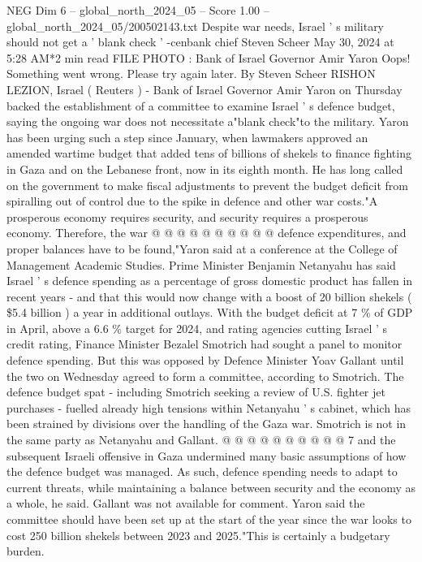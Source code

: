 \begin{textsample}{NEG Dim 6 – global\_north\_2024\_05 – Score 1.00 – global\_north\_2024\_05/200502143.txt}  \label{ex:f6_neg_303}
Despite war needs, Israel ' s military should not get a ' blank check ' -cenbank chief Steven Scheer May 30, 2024 at 5:28 AM*2 min read FILE PHOTO : Bank of Israel Governor Amir Yaron Oops!
Something went wrong.
Please try again later.
By Steven Scheer RISHON LEZION, Israel ( Reuters ) - Bank of Israel Governor Amir Yaron on Thursday backed the establishment of a committee to examine Israel ' s defence budget, saying the ongoing war does not necessitate a"blank check"to the military.
Yaron has been urging such a step since January, when lawmakers approved an amended wartime budget that added tens of billions of shekels to finance fighting in Gaza and on the Lebanese front, now in its eighth month.
He has long called on the government to make fiscal adjustments to prevent the budget deficit from spiralling out of control due to the spike in defence and other war costs."A prosperous economy requires security, and security requires a prosperous economy.
Therefore, the war @ @ @ @ @ @ @ @ @ @ defence expenditures, and proper balances have to be found,"Yaron said at a conference at the College of Management Academic Studies.
Prime Minister Benjamin Netanyahu has said Israel ' s defence spending as a percentage of gross domestic product has fallen in recent years - and that this would now change with a boost of 20 billion shekels ( \$5.4 billion ) a year in additional outlays.
With the budget deficit at 7 \% of GDP in April, above a 6.6 \% target for 2024, and rating agencies cutting Israel ' s credit rating, Finance Minister Bezalel Smotrich had sought a panel to monitor defence spending.
But this was opposed by Defence Minister Yoav Gallant until the two on Wednesday agreed to form a committee, according to Smotrich.
The defence budget spat - including Smotrich seeking a review of U.S. fighter jet purchases - fuelled already high tensions within Netanyahu ' s cabinet, which has been strained by divisions over the handling of the Gaza war.
Smotrich is not in the same party as Netanyahu and Gallant. @ @ @ @ @ @ @ @ @ @ 7 and the subsequent Israeli offensive in Gaza undermined many basic assumptions of how the defence budget was managed.
As such, defence spending needs to adapt to current threats, while maintaining a balance between security and the economy as a whole, he said.
Gallant was not available for comment.
Yaron said the committee should have been set up at the start of the year since the war looks to cost 250 billion shekels between 2023 and 2025."This is certainly a budgetary burden.

\end{textsample}
